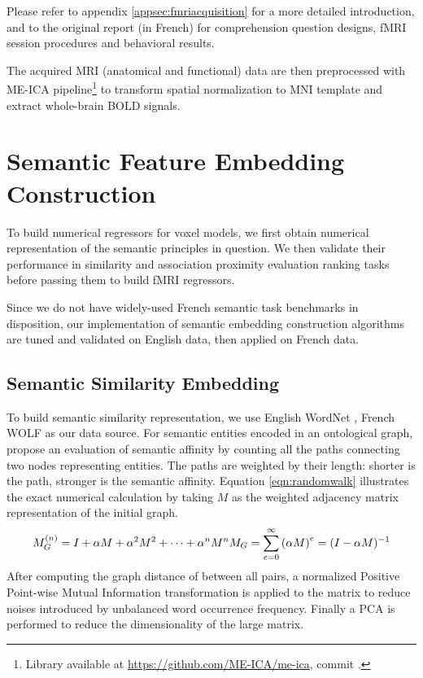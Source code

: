 Please refer to appendix \ref{appsec:fmriacquisition} for a more detailed introduction, and to the original report (in French) \parencite{todorovicAnalysesIRMfLors2018} for comprehension question designs, fMRI session procedures and behavioral results.

The acquired MRI (anatomical and functional) data are then preprocessed with ME-ICA pipeline\footnote{Library available at \url{https://github.com/ME-ICA/me-ica}, commit .} \parencite{kunduDifferentiatingBOLDNonBOLD2012} to transform spatial normalization to MNI template and extract whole-brain BOLD signals. 

\section{Semantic Feature Embedding Construction}

To build numerical regressors for voxel models, we first obtain numerical representation of the semantic principles in question. We then validate their performance in similarity and association proximity evaluation ranking tasks before passing them to build fMRI regressors.

Since we do not have widely-used French semantic task benchmarks in disposition, our implementation of semantic embedding construction algorithms are tuned and validated on English data, then applied on French data. 


\subsection{Semantic Similarity Embedding}
\label{subsec:semanticsimilaritymethod}
To build semantic similarity representation, we use English WordNet \parencite{millerWordNetLexicalDatabase1995, millerWordNetElectronicLexical1998}, French WOLF \parencite{sagotBuildingFreeFrench2008} as our data source. For semantic entities encoded in an ontological graph, \cite{saediWordNetEmbeddings2018} propose an evaluation of semantic affinity by counting all the paths connecting two nodes representing entities. The paths are weighted by their length: shorter is the path, stronger is the semantic affinity. Equation \ref{eqn:randomwalk} illustrates the exact numerical calculation by taking \(M\) as the weighted adjacency matrix representation of the initial graph. 
\begin{equation}
    M_G^{(n)} = I + \alpha M + \alpha^2 M^2 + \dots + \alpha^n M^n \\
    M_G = \sum_{e=0}^{\infty}{(\alpha M)}^e = (I - \alpha M)^{-1}
\label{eqn:randomwalk}
    \end{equation}
 After computing the graph distance of between all pairs, a normalized Positive Point-wise Mutual Information transformation is applied to the matrix to reduce noises introduced by unbalanced word occurrence frequency. Finally a PCA is performed to reduce the dimensionality of the large matrix. 

